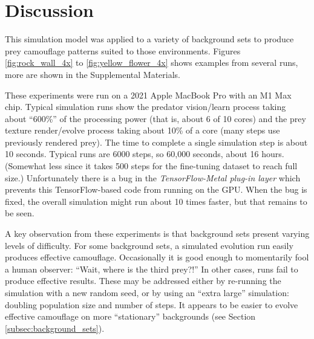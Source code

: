 \documentclass[acmtog,
    anonymous,
    review
    ]{acmart}
\newcommand{\jargon}[1]{\textit{#1}}
\begin{document}

\section{Discussion}
\label{sec:discussion}
This simulation model was applied to a variety of background sets to produce prey camouflage patterns suited to those environments. Figures \ref{fig:rock_wall_4x} to \ref{fig:yellow_flower_4x} shows examples from several runs, more are shown in the Supplemental Materials.
\par
These experiments were run on a 2021 Apple MacBook Pro with an M1 Max chip. Typical simulation runs show the predator vision/learn process taking about “600\%” of the processing power (that is, about 6 of 10 cores) and the prey texture render/evolve process taking about 10\% of a core (many steps use previously rendered prey). The time to complete a single simulation step is about 10 seconds. Typical runs are 6000 steps, so 60,000 seconds, about 16 hours. (Somewhat less since it takes 500 steps for the fine-tuning dataset to reach full size.) Unfortunately there is a bug in the \jargon{TensorFlow-Metal plug-in layer} which prevents this TensorFlow-based code from running on the GPU. When the bug is fixed, the overall simulation might run about 10 times faster, but that remains to be seen.
\par
A key observation from these experiments is that background sets present varying levels of difficulty. For some background sets, a simulated evolution run easily produces effective camouflage. Occasionally it is good enough to momentarily fool a human observer: “Wait, where is the third prey?!” In other cases, runs fail to produce effective results. These may be addressed either by re-running the simulation with a new random seed, or by using an “extra large” simulation: doubling population size and number of steps. It appears to be easier to evolve effective camouflage on more “stationary” backgrounds (see Section \ref{subsec:background_sets}).

\par
\end{document}
